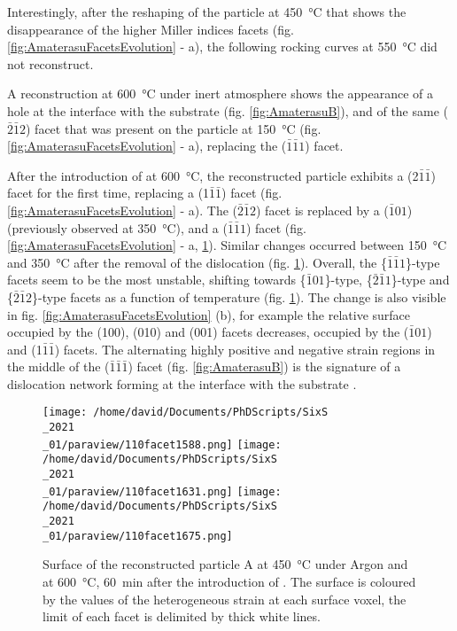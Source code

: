 Interestingly, after the reshaping of the particle at \qty{450}{\degreeCelsius} that shows the disappearance of the higher Miller indices facets (fig. \ref{fig:AmaterasuFacetsEvolution} - a), the following rocking curves at \qty{550}{\degreeCelsius} did not reconstruct.

A reconstruction at \qty{600}{\degreeCelsius} under inert atmosphere shows the appearance of a hole at the interface with the substrate (fig. \ref{fig:AmaterasuB}), and of the same ($\bar{2}\bar{1}2$) facet that was present on the particle at \qty{150}{\degreeCelsius} (fig. \ref{fig:AmaterasuFacetsEvolution} - a), replacing the ($\bar{1}\bar{1}1$) facet.

After the introduction of  at \qty{600}{\degreeCelsius}, the reconstructed particle exhibits a (2$\bar{1}\bar{1}$) facet for the first time, replacing a (1$\bar{1}\bar{1}$) facet (fig. \ref{fig:AmaterasuFacetsEvolution} - a).
The ($\bar{2}\bar{1}2$) facet is replaced by a ($\bar{1}01$) (previously observed at \qty{350}{\degreeCelsius}), and a ($\bar{1}\bar{1}1$) facet (fig. \ref{fig:AmaterasuFacetsEvolution} - a, \ref{fig:Amaterasu110}).
Similar changes occurred between \qty{150}{\degreeCelsius} and \qty{350}{\degreeCelsius} after the removal of the dislocation (fig. \ref{fig:Amaterasu110}).
Overall, the \{$\bar{1}\bar{1}1$\}-type facets seem to be the most unstable, shifting towards \{$\bar{1}01$\}-type, \{$\bar{2}\bar{1}1$\}-type and \{$\bar{2}\bar{1}2$\}-type facets as a function of temperature (fig. \ref{fig:Amaterasu110}).
The change is also visible in fig. \ref{fig:AmaterasuFacetsEvolution} (b), for example the relative surface occupied by the (100), (010) and (001) facets decreases, occupied by the ($\bar{1}01$) and (1$\bar{1}\bar{1}$) facets.
The alternating highly positive and negative strain regions in the middle of the ($\bar{1}\bar{1}\bar{1}$) facet (fig. \ref{fig:AmaterasuB}) is the signature of a dislocation network forming at the interface with the substrate \parencite{Dupraz2015}.

\begin{figure}[!htb]
    \centering
    \texttt{[image: /home/david/Documents/PhDScripts/SixS\\\_2021\\\_01/paraview/110facet1588.png]}
    \texttt{[image: /home/david/Documents/PhDScripts/SixS\\\_2021\\\_01/paraview/110facet1631.png]}
    \texttt{[image: /home/david/Documents/PhDScripts/SixS\\\_2021\\\_01/paraview/110facet1675.png]}
    \caption{
        Surface of the reconstructed particle A at \qty{450}{\degreeCelsius} under Argon and at \qty{600}{\degreeCelsius}, \qty{60}{\minute} after the introduction of .
        The surface is coloured by the values of the heterogeneous strain at each surface voxel, the limit of each facet is delimited by thick white lines.
    }
    \label{fig:Amaterasu110}
\end{figure}

